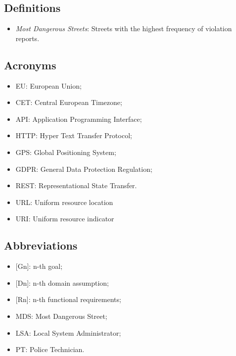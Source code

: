 \subsection{Definitions}
\begin{itemize}
  \item \textit{Most Dangerous Streets}: Streets with the highest frequency of violation reports.
\end{itemize}

\subsection{Acronyms}
\begin{itemize}
  \item EU: European Union;
  \item CET: Central European Timezone;
  \item API: Application Programming Interface;
  \item HTTP: Hyper Text Transfer Protocol;
  \item GPS: Global Positioning System;
  \item GDPR: General Data Protection Regulation;
  \item REST: Representational State Transfer.
  \item URL: Uniform resource location
  \item URI: Uniform resource indicator
\end{itemize}

\subsection{Abbreviations}
\begin{itemize}
  \item {[Gn]}: n-th goal;
  \item {[Dn]}: n-th domain assumption;
  \item {[Rn]}: n-th functional requirements;
  \item MDS: Most Dangerous Street;
  \item LSA: Local System Administrator;
  \item PT: Police Technician.
\end{itemize}
